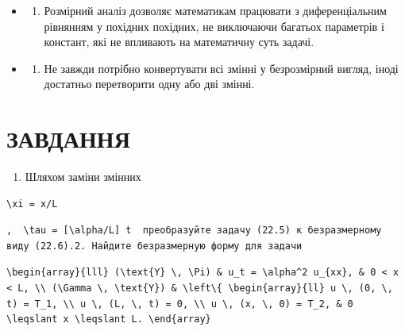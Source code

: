 \documentclass[
  ukrainian,
]{article}
\providecommand{\tightlist}{%
  \setlength{\itemsep}{0pt}\setlength{\parskip}{0pt}}
\begin{document}
\begin{itemize}
\tightlist
\item
  \begin{enumerate}
  \def\labelenumi{\arabic{enumi}.}
  \setcounter{enumi}{1}
  \tightlist
  \item
    Розмірний аналіз дозволяє математикам працювати з диференціальним
    рівнянням у похідних похідних, не виключаючи багатьох параметрів і
    констант, які не впливають на математичну суть задачі.
  \end{enumerate}
\item
  \begin{enumerate}
  \def\labelenumi{\arabic{enumi}.}
  \setcounter{enumi}{2}
  \tightlist
  \item
    Не завжди потрібно конвертувати всі змінні у безрозмірний вигляд,
    іноді достатньо перетворити одну або дві змінні.
  \end{enumerate}
\end{itemize}

\section{ЗАВДАННЯ}\label{ux437ux430ux432ux434ux430ux43dux43dux44f}

\begin{enumerate}
\def\labelenumi{\arabic{enumi}.}
\tightlist
\item
  Шляхом заміни змінних
\end{enumerate}

\begin{verbatim}
\xi = x/L
\end{verbatim}

\begin{verbatim}
,  \tau = [\alpha/L] t  преобразуйте задачу (22.5) к безразмерному виду (22.6).2. Найдите безразмерную форму для задачи
\end{verbatim}

\begin{verbatim}
\begin{array}{lll} (\text{Y} \, \Pi) & u_t = \alpha^2 u_{xx}, & 0 < x < L, \\ (\Gamma \, \text{Y}) & \left\{ \begin{array}{ll} u \, (0, \, t) = T_1, \\ u \, (L, \, t) = 0, \\ u \, (x, \, 0) = T_2, & 0 \leqslant x \leqslant L. \end{array}
\end{verbatim}
\end{document}
